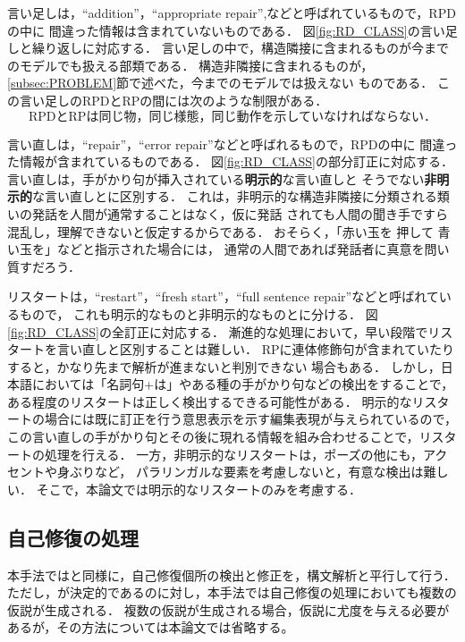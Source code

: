 言い足しは，``addition''，``appropriate repair'',などと呼ばれているもので，RPDの中に
間違った情報は含まれていないものである．
図\ref{fig:RD_CLASS}の言い足しと繰り返しに対応する．
言い足しの中で，構造隣接に含まれるものが今までのモデルでも扱える部類である．
構造非隣接に含まれるものが，\ref{subsec:PROBLEM}節で述べた，今までのモデルでは扱えない
ものである．
この言い足しのRPDとRPの間には次のような制限がある．
\begin{equation}
\label{addition_constraint} \mbox{RPDとRPは同じ物，同じ様態，同じ動作を示していなければならない．}
\end{equation}

言い直しは，``repair''，``error repair''などと呼ばれるもので，RPDの中に
間違った情報が含まれているものである．
図\ref{fig:RD_CLASS}の部分訂正に対応する．
言い直しは，手がかり句が挿入されている{\bf 明示的}な言い直しと
そうでない{\bf 非明示的}な言い直しとに区別する．
これは，非明示的な構造非隣接に分類される類いの発話を人間が通常することはなく，仮に発話
されても人間の聞き手ですら混乱し，理解できないと仮定するからである．
おそらく，「赤い玉を 押して 青い玉を」などと指示された場合には，
通常の人間であれば発話者に真意を問い質すだろう．

リスタートは，``restart''，``fresh start''，``full sentence repair''などと呼ばれているもので，
これも明示的なものと非明示的なものとに分ける．
図\ref{fig:RD_CLASS}の全訂正に対応する．
漸進的な処理において，早い段階でリスタートを言い直しと区別することは難しい．
RPに連体修飾句が含まれていたりすると，かなり先まで解析が進まないと判別できない
場合もある．
しかし，日本語においては「名詞句+は」やある種の手がかり句などの検出をすることで，
ある程度のリスタートは正しく検出するできる可能性がある．
明示的なリスタートの場合には既に訂正を行う意思表示を示す編集表現が与えられているので，
この言い直しの手がかり句とその後に現れる情報を組み合わせることで，リスタートの処理を行える．
一方，非明示的なリスタートは，ポーズの他にも，アクセントや身ぶりなど，
パラリンガルな要素を考慮しないと，有意な検出は難しい．
そこで，本論文では明示的なリスタートのみを考慮する．

\subsection{自己修復の処理}
本手法では\cite{HD1983}と同様に，自己修復個所の検出と修正を，構文解析と平行して行う．
ただし，\cite{HD1983}が決定的であるのに対し，本手法では自己修復の処理においても複数の仮説が生成される．
複数の仮説が生成される場合，仮説に尤度を与える必要があるが，その方法については本論文では省略する。

